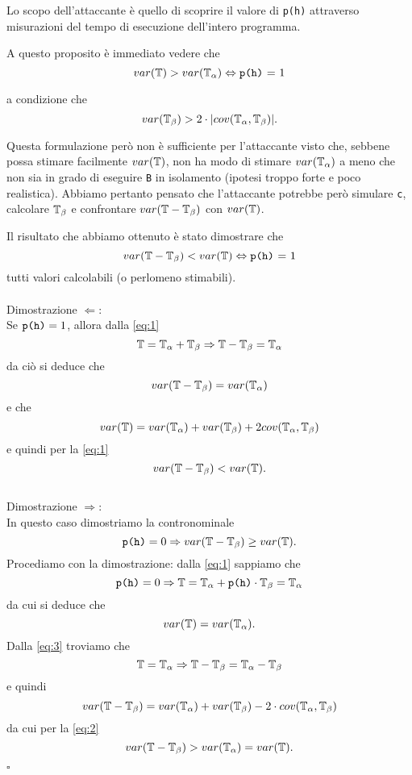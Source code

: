 	Lo scopo dell'attaccante è quello di scoprire il valore di \texttt{p(h)} attraverso misurazioni del tempo di esecuzione dell'intero programma.
	
	A questo proposito è immediato vedere che $$var(\mathbb{T}) > var(\mathbb{T}_{\alpha}) \Leftrightarrow \text{\texttt{p(h)} = 1}$$ 
	
	a condizione che 
	\begin{equation} \label{eq:2}
		var(\mathbb{T}_{\beta}) > 2 \cdot |cov(\mathbb{T}_{\alpha},\mathbb{T}_{\beta})|.
	\end{equation}
		
	Questa formulazione però non è sufficiente per l'attaccante visto che, sebbene possa stimare facilmente $var(\mathbb{T})$, non ha modo di stimare $var(\mathbb{T}_{\alpha})$ a meno che non sia in grado di eseguire \texttt{B} in isolamento (ipotesi troppo forte e poco realistica). Abbiamo pertanto pensato che l'attaccante potrebbe però simulare \texttt{c}, calcolare $\mathbb{T}_{\beta}$ e confrontare $var(\mathbb{T} - \mathbb{T}_{\beta})$ con $var(\mathbb{T})$. 
	
	Il risultato che abbiamo ottenuto è stato dimostrare che $$var(\mathbb{T} - \mathbb{T}_{\beta}) < var(\mathbb{T}) \Leftrightarrow \text{\texttt{p(h)} = 1}$$ tutti valori calcolabili (o perlomeno stimabili).\\ \\Dimostrazione $\Leftarrow$:\\
	Se $\text{\texttt{p(h)}} = 1$, allora dalla \ref{eq:1} $$\mathbb{T} = \mathbb{T}_{\alpha} + \mathbb{T}_{\beta} \Rightarrow \mathbb{T} - \mathbb{T}_{\beta} = \mathbb{T}_{\alpha}$$
	da ciò si deduce che $$var(\mathbb{T} - \mathbb{T}_{\beta}) = var(\mathbb{T}_{\alpha})$$ 
	e che $$var(\mathbb{T}) = var(\mathbb{T}_{\alpha}) + var(\mathbb{T}_{\beta}) + 2cov(\mathbb{T}_{\alpha},\mathbb{T}_{\beta})$$
	e quindi per la \ref{eq:1} $$var(\mathbb{T} - \mathbb{T}_{\beta}) < var(\mathbb{T}).$$\\Dimostrazione $\Rightarrow$:\\
	In questo caso dimostriamo la contronominale $$\text{\texttt{p(h)}} = 0 \Rightarrow var(\mathbb{T} - \mathbb{T}_{\beta}) \geq var(\mathbb{T}).$$  
	Procediamo con la dimostrazione:
	dalla \ref{eq:1} sappiamo che
	\begin{equation} \label{eq:3}
		\text{\texttt{p(h)}} = 0 \Rightarrow \mathbb{T} = \mathbb{T}_{\alpha} + \text{\texttt{p(h)}}\cdot \mathbb{T}_{\beta} = \mathbb{T}_{\alpha}
	\end{equation}
	da cui si deduce che $$var(\mathbb{T}) = var(\mathbb{T}_{\alpha}).$$
	Dalla \ref{eq:3} troviamo che
	$$\mathbb{T} = \mathbb{T}_{\alpha} \Rightarrow \mathbb{T} - \mathbb{T}_{\beta} = \mathbb{T}_{\alpha} - \mathbb{T}_{\beta}$$
	e quindi
	$$var(\mathbb{T} - \mathbb{T}_{\beta}) = var(\mathbb{T}_{\alpha}) + var(\mathbb{T}_{\beta}) - 2\cdot cov (\mathbb{T}_{\alpha},\mathbb{T}_{\beta})$$
	da cui per la \ref{eq:2}
	$$var(\mathbb{T} - \mathbb{T}_{\beta}) > var(\mathbb{T}_{\alpha}) = var(\mathbb{T}).$$
	\begin{flushright}
		$\square$
	\end{flushright}

